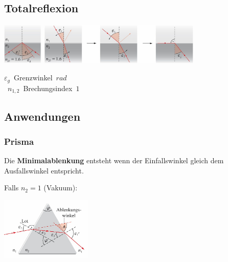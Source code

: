 \subsection{Totalreflexion}

\begin{center}
	\begin{minipage}{0.1\textwidth}
	\end{minipage}%
	\begin{minipage}{0.5\textwidth}
		\includegraphics[height=2cm,keepaspectratio=true]{Images/totalreflexion.png}
		\includegraphics[height=2cm,keepaspectratio=true]{Images/einfallswinkel.png}
	\end{minipage}
\end{center}

\unit{$\varepsilon_g$}{Grenzwinkel}{$rad$} \\
\unit{$n_{1,2}$}{Brechungsindex}{$1$}




\subsection{Anwendungen}
\subsubsection{Prisma}

Die \textbf{Minimalablenkung} entsteht wenn der Einfallswinkel gleich dem Ausfallswinkel entspricht.

\begin{center}
	\begin{minipage}{0.3\textwidth}
	
		Falls $ n_2 = 1 $ (Vakuum):
	\end{minipage}%
	\begin{minipage}{0.3\textwidth}
		\includegraphics[height=3cm,keepaspectratio=true]{Images/prisma.png}
	\end{minipage}
\end{center}

